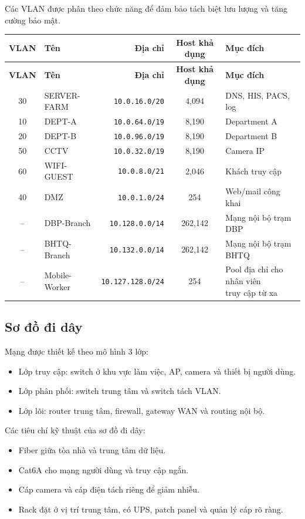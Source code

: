 Các VLAN được phân theo chức năng để đảm bảo tách biệt lưu lượng và tăng cường bảo mật.

\begin{longtable}{@{}|c|l|r|c|l|@{}}
\hline
\textbf{VLAN} & \textbf{Tên} & \textbf{Địa chỉ} & \textbf{Host khả dụng} & \textbf{Mục đích} \\
\hline
\endfirsthead
\hline
\textbf{VLAN} & \textbf{Tên} & \textbf{Địa chỉ} & \textbf{Host khả dụng} & \textbf{Mục đích} \\
\hline
\endhead
30 & SERVER-FARM & \texttt{10.0.16.0/20} & 4,094 & DNS, HIS, PACS, log \\
10 & DEPT-A & \texttt{10.0.64.0/19} & 8,190 & Department A \\
20 & DEPT-B & \texttt{10.0.96.0/19} & 8,190 & Department B \\
50 & CCTV & \texttt{10.0.32.0/19} & 8,190 & Camera IP \\
60 & WIFI-GUEST & \texttt{10.0.8.0/21} & 2,046 & Khách truy cập \\
40 & DMZ & \texttt{10.0.1.0/24} & 254 & Web/mail công khai \\
-- & DBP-Branch & \texttt{10.128.0.0/14} & 262,142 & Mạng nội bộ trạm DBP \\
-- & BHTQ-Branch & \texttt{10.132.0.0/14} & 262,142 & Mạng nội bộ trạm BHTQ \\
-- & Mobile-Worker & \texttt{10.127.128.0/24} & 254 & \shortstack[l]{Pool địa chỉ cho nhân viên\\truy cập từ xa} \\
\hline
\end{longtable}

\subsection{Sơ đồ đi dây}

Mạng được thiết kế theo mô hình 3 lớp:

\begin{itemize}
    \item Lớp truy cập: switch ở khu vực làm việc, AP, camera và thiết bị người dùng.
    \item Lớp phân phối: switch trung tâm và switch tách VLAN.
    \item Lớp lõi: router trung tâm, firewall, gateway WAN và routing nội bộ.
\end{itemize}

Các tiêu chí kỹ thuật của sơ đồ đi dây:

\begin{itemize}
    \item Fiber giữa tòa nhà và trung tâm dữ liệu.
    \item Cat6A cho mạng người dùng và truy cập ngắn.
    \item Cáp camera và cáp điện tách riêng để giảm nhiễu.
    \item Rack đặt ở vị trí trung tâm, có UPS, patch panel và quản lý cáp rõ ràng.
\end{itemize}

